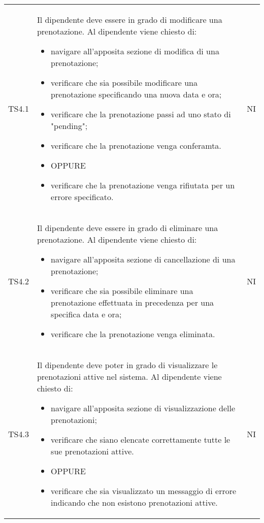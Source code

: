 {\begin{longtable}{ c C{11cm} c }
        TS4.1&
        Il dipendente deve essere in grado di modificare una prenotazione.\newline
        Al dipendente viene chiesto di:
        \begin{itemize}
            \item navigare all'apposita sezione di modifica di una prenotazione;
            \item verificare che sia possibile modificare una prenotazione specificando una nuova data e ora;
            \item verificare che la prenotazione passi ad uno stato di "pending";
            \item verificare che la prenotazione venga conferamta.
            \item [] OPPURE
            \item verificare che la prenotazione venga rifiutata per un errore specificato.
        \end{itemize}&
        NI\\
        TS4.2&
        Il dipendente deve essere in grado di eliminare una prenotazione.\newline
        Al dipendente viene chiesto di:
        \begin{itemize}
            \item navigare all'apposita sezione di cancellazione di una prenotazione;
            \item verificare che sia possibile eliminare una prenotazione effettuata in precedenza per una specifica data e ora;
            \item verificare che la prenotazione venga eliminata.
        \end{itemize}&
        NI\\
        TS4.3&
        Il dipendente deve poter in grado di visualizzare le prenotazioni attive nel sistema.\newline
        Al dipendente viene chiesto di:
        \begin{itemize}
            \item navigare all'apposita sezione di visualizzazione delle prenotazioni;
            \item verificare che siano elencate correttamente tutte le sue prenotazioni attive.
            \item [] OPPURE
            \item verificare che sia visualizzato un messaggio di errore indicando che non esistono prenotazioni attive.
        \end{itemize}&
        NI\\


\end{longtable}}
